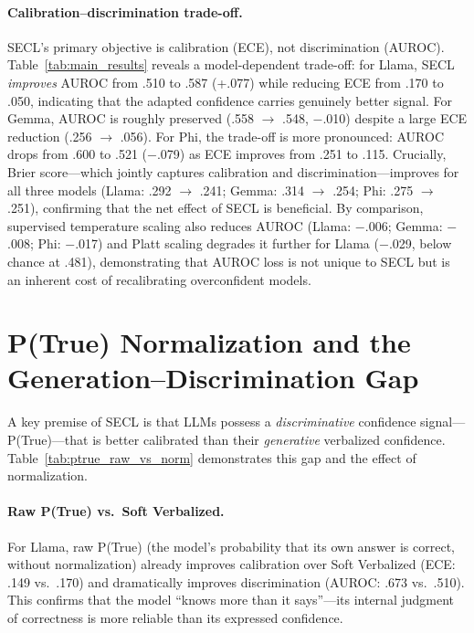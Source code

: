 \paragraph{Calibration--discrimination trade-off.}
SECL's primary objective is calibration (ECE), not discrimination (AUROC).
Table~\ref{tab:main_results} reveals a model-dependent trade-off:
for Llama, SECL \emph{improves} AUROC from .510 to .587 (+.077)
while reducing ECE from .170 to .050,
indicating that the adapted confidence carries genuinely better signal.
For Gemma, AUROC is roughly preserved (.558 $\to$ .548, $-$.010)
despite a large ECE reduction (.256 $\to$ .056).
For Phi, the trade-off is more pronounced:
AUROC drops from .600 to .521 ($-$.079) as ECE improves from .251 to .115.
Crucially, Brier score---which jointly captures calibration and
discrimination---improves for all three models
(Llama: .292 $\to$ .241; Gemma: .314 $\to$ .254; Phi: .275 $\to$ .251),
confirming that the net effect of SECL is beneficial.
By comparison, supervised temperature scaling also reduces AUROC
(Llama: $-$.006; Gemma: $-$.008; Phi: $-$.017)
and Platt scaling degrades it further for Llama ($-$.029, below chance at .481),
demonstrating that AUROC loss is not unique to SECL but is an inherent
cost of recalibrating overconfident models.


\section{P(True) Normalization and the Generation--Discrimination Gap} \label{app:ptrue_norm}

A key premise of SECL is that LLMs possess a \emph{discriminative} 
confidence signal---P(True)---that is better calibrated than their 
\emph{generative} verbalized confidence.
Table~\ref{tab:ptrue_raw_vs_norm} demonstrates this gap and the 
effect of normalization.

\paragraph{Raw P(True) vs.\ Soft Verbalized.}
For Llama, raw P(True) (the model's probability that its own answer 
is correct, without normalization) already improves calibration over 
Soft Verbalized (ECE: .149 vs.\ .170) and dramatically improves 
discrimination (AUROC: .673 vs.\ .510).
This confirms that the model ``knows more than it says''---its 
internal judgment of correctness is more reliable than its 
expressed confidence.

